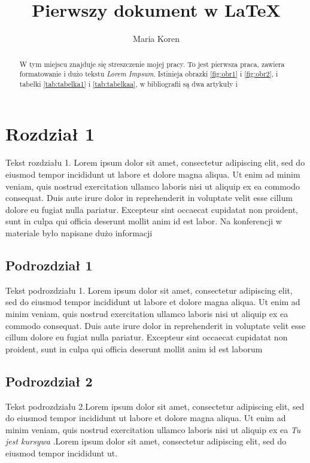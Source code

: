 \documentclass[12pt,a4paper,titlepage]{article}
\title{Pierwszy dokument w \LaTeX }
\author{Maria Koren }
\begin{document}
\maketitle
\tableofcontents




\begin{abstract}
W tym miejscu znajduje się streszczenie mojej pracy. To jest pierwsza praca, zawiera formatowanie i dużo tekstu \textit{Lorem Impsum}. Istinieja obrazki \ref{fig:obr1} i \ref{fig:obr2}, i tabelki \ref{tab:tabelka1} i \ref{tab:tabelkaa}, w bibliografii są  dwa artykuły \cite{artykul1} i \cite{artykul2}
\end{abstract}



\section{Rozdział 1}


Tekst rozdziału 1. Lorem ipsum dolor sit amet, consectetur adipiscing elit, sed do eiusmod tempor incididunt ut labore et dolore magna aliqua. Ut enim ad minim veniam, quis nostrud exercitation ullamco laboris nisi ut aliquip ex ea commodo consequat. Duis aute irure dolor in reprehenderit in voluptate velit esse cillum dolore eu fugiat nulla pariatur. Excepteur sint occaecat cupidatat non proident, sunt in culpa qui officia deserunt mollit anim id est labor. Na konferencji w materiale \cite{konferencja1} było napisane dużo informacji

\subsection{Podrozdział 1} 
Tekst podrozdziału 1. Lorem ipsum dolor sit amet, consectetur adipiscing elit, sed do eiusmod tempor incididunt ut labore et dolore magna aliqua. Ut enim ad minim veniam, quis nostrud exercitation ullamco laboris nisi ut aliquip ex ea commodo consequat. Duis aute irure dolor in reprehenderit in voluptate velit esse cillum dolore eu fugiat nulla pariatur. Excepteur sint occaecat cupidatat non proident, sunt in culpa qui officia deserunt mollit anim id est laborum

\subsection{Podrozdział 2}
Tekst podrozdziału 2.Lorem ipsum dolor sit amet, consectetur adipiscing elit, sed do eiusmod tempor incididunt ut labore et dolore magna aliqua. Ut enim ad minim veniam, quis nostrud exercitation ullamco laboris nisi ut aliquip ex ea \textit{Tu jest kursywa} .Lorem ipsum dolor sit amet, consectetur adipiscing elit, sed do eiusmod tempor incididunt ut.
\end{document}
